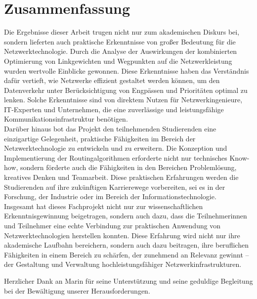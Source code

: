 \documentclass[sigconf, nonacm, review]{acmart}
\begin{document}
\section{Zusammenfassung}
Die Ergebnisse dieser Arbeit trugen nicht nur zum akademischen Diskurs bei, sondern lieferten auch praktische Erkenntnisse von großer Bedeutung für die Netzwerktechnologie. Durch die Analyse der Auswirkungen der kombinierten Optimierung von Linkgewichten und Wegpunkten auf die Netzwerkleistung wurden wertvolle Einblicke gewonnen. Diese Erkenntnisse haben das Verständnis dafür vertieft, wie Netzwerke effizient gestaltet werden können, um den Datenverkehr unter Berücksichtigung von Engpässen und Prioritäten optimal zu lenken. Solche Erkenntnisse sind von direktem Nutzen für Netzwerkingenieure, IT-Experten und Unternehmen, die eine zuverlässige und leistungsfähige Kommunikationsinfrastruktur benötigen.\\
Darüber hinaus bot das Projekt den teilnehmenden Studierenden eine einzigartige Gelegenheit, praktische Fähigkeiten im Bereich der Netzwerktechnologie zu entwickeln und zu erweitern. Die Konzeption und Implementierung der Routingalgorithmen erforderte nicht nur technisches Know-how, sondern förderte auch die Fähigkeiten in den Bereichen Problemlösung, kreatives Denken und Teamarbeit. Diese praktischen Erfahrungen werden die Studierenden auf ihre zukünftigen Karrierewege vorbereiten, sei es in der Forschung, der Industrie oder im Bereich der Informationstechnologie.\\
Insgesamt hat dieses Fachprojekt nicht nur zur wissenschaftlichen Erkenntnisgewinnung beigetragen, sondern auch dazu, dass die Teilnehmerinnen und Teilnehmer eine echte Verbindung zur praktischen Anwendung von Netzwerktechnologien herstellen konnten. Diese Erfahrung wird nicht nur ihre akademische Laufbahn bereichern, sondern auch dazu beitragen, ihre beruflichen Fähigkeiten in einem Bereich zu schärfen, der zunehmend an Relevanz gewinnt – der Gestaltung und Verwaltung hochleistungsfähiger Netzwerkinfrastrukturen.

\begin{acks}
Herzlicher Dank an Marin f\"ur seine Unterstützung und seine geduldige Begleitung bei der Bewältigung unserer Herausforderungen.
\end{acks}




\appendix
\end{document}
